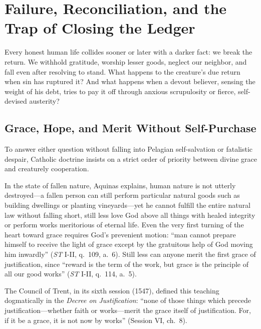 \section{Failure, Reconciliation, and the Trap of Closing the Ledger}

Every honest human life collides sooner or later with a darker fact: we break the return. We withhold gratitude, worship lesser goods, neglect our neighbor, and fall even after resolving to stand. What happens to the creature's due return when sin has ruptured it? And what happens when a devout believer, sensing the weight of his debt, tries to pay it off through anxious scrupulosity or fierce, self-devised austerity?

\subsection{Grace, Hope, and Merit Without Self-Purchase}

To answer either question without falling into Pelagian self-salvation or fatalistic despair, Catholic doctrine insists on a strict order of priority between divine grace and creaturely cooperation.

In the state of fallen nature, Aquinas explains, human nature is not utterly destroyed---a fallen person can still perform particular natural goods such as building dwellings or planting vineyards---yet he cannot fulfill the entire natural law without falling short, still less love God above all things with healed integrity or perform works meritorious of eternal life. Even the very first turning of the heart toward grace requires God's prevenient motion: ``man cannot prepare himself to receive the light of grace except by the gratuitous help of God moving him inwardly'' (\emph{ST} I-II, q.\ 109, a.\ 6). Still less can anyone merit the first grace of justification, since ``reward is the term of the work, but grace is the principle of all our good works'' (\emph{ST} I-II, q.\ 114, a.\ 5).

The Council of Trent, in its sixth session (1547), defined this teaching dogmatically in the \emph{Decree on Justification}: ``none of those things which precede justification---whether faith or works---merit the grace itself of justification. For, if it be a grace, it is not now by works'' (Session VI, ch.\ 8).

